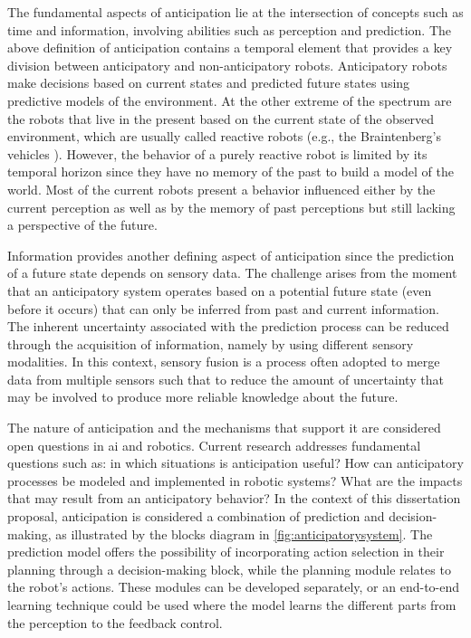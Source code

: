 The fundamental aspects of anticipation lie at the intersection of concepts such as time and information, involving abilities such as perception and prediction. The above definition of anticipation contains a temporal element that provides a key division between anticipatory and non-anticipatory robots. Anticipatory robots make decisions based on current states and predicted future states using predictive models of the environment. At the other extreme of the spectrum are the robots that live in the present based on the current state of the observed environment, which are usually called reactive robots (e.g., the Braintenberg’s vehicles \cite{Braitenberg1986}). However, the behavior of a purely reactive robot is limited by its temporal horizon since they have no memory of the past to build a model of the world. Most of the current robots present a behavior influenced either by the current perception as well as by the memory of past perceptions but still lacking a perspective of the future.

Information provides another defining aspect of anticipation since the prediction of a future state depends on sensory data. The challenge arises from the moment that an anticipatory system operates based on a potential future state (even before it occurs) that can only be inferred from past and current information. The inherent uncertainty associated with the prediction process can be reduced through the acquisition of information, namely by using different sensory modalities. In this context, sensory fusion is a process often adopted to merge data from multiple sensors such that to reduce the amount of uncertainty that may be involved to produce more reliable knowledge about the future.

The nature of anticipation and the mechanisms that support it are considered open questions in \acs{ai} and robotics. Current research addresses fundamental questions such as: in which situations is anticipation useful? How can anticipatory processes be modeled and implemented in robotic systems? What are the impacts that may result from an anticipatory behavior? In the context of this dissertation proposal, anticipation is considered a combination of prediction and decision-making, as illustrated by the blocks diagram in \autoref{fig:anticipatorysystem}. The prediction model offers the possibility of incorporating action selection in their planning through a decision-making block, while the planning module relates to the robot’s actions. These modules can be developed separately, or an end-to-end learning technique could be used where the model learns the different parts from the perception to the feedback control. 

